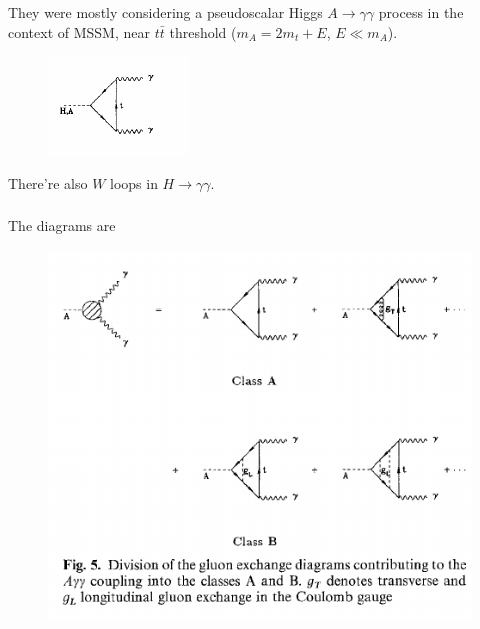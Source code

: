 \documentclass[8pt,dvipsnames,table]{beamer}
\begin{document}
\section{\citet{Melnikov:1994jb}}
\begin{frame}
	\frametitle{\citet{Melnikov:1994jb}}

	They were mostly considering a pseudoscalar Higgs $A\to \gamma\gamma$ process in the context of MSSM, near $t\bar t$ threshold ($m_A=2m_t+E$, $E\ll m_A$).
	\begin{figure}[!htb]
		\centering
		\includegraphics[]{image2.png}
		\label{fig:image2}
	\end{figure}
	There're also $W$ loops in $H\to \gamma\gamma$.

\end{frame}

\begin{frame}
	\frametitle{\citet{Melnikov:1994jb}}

	The diagrams are
	\begin{figure}[!htb]
		\centering
		\includegraphics[width=0.8\linewidth]{image4.png}
		\label{fig:image4}
	\end{figure}


\end{frame}
\end{document}
